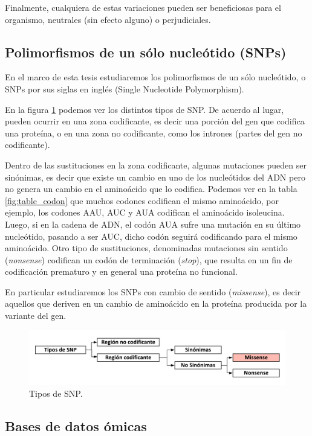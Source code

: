 Finalmente, cualquiera de estas variaciones pueden ser beneficiosas para el organismo, neutrales (sin efecto alguno) o perjudiciales. 

\subsection{Polimorfismos de un sólo nucleótido (SNPs)}

En el marco de esta tesis estudiaremos los polimorfismos de un sólo nucleótido, o SNPs por sus siglas en inglés (Single Nucleotide Polymorphism). 

En la figura \ref{fig:snp_types} podemos ver los distintos tipos de SNP. De acuerdo al lugar, pueden ocurrir en una zona codificante, es decir una porción del gen que codifica una proteína, o en una zona no codificante, como los intrones (partes del gen no codificante).

Dentro de las sustituciones en la zona codificante, algunas mutaciones pueden ser sinónimas, es decir que existe un cambio en uno de los nucleótidos del ADN pero no genera un cambio en el aminoácido que lo codifica. Podemos ver en la tabla \ref{fig:table_codon} que muchos codones codifican el mismo aminoácido, por ejemplo, los codones AAU, AUC y AUA codifican el aminoácido isoleucina. Luego, si en la cadena de ADN, el codón AUA sufre una mutación en su último nucleótido, pasando a ser AUC, dicho codón seguirá codificando para el mismo aminoácido. Otro tipo de sustituciones, denominadas mutaciones sin sentido (\textit{nonsense}) codifican un codón de terminación (\textit{stop}), que resulta en un fin de codificación prematuro y en general una proteína no funcional.

En particular estudiaremos los SNPs con cambio de sentido (\textit{missense}), es decir aquellos que deriven en un cambio de aminoácido en la proteína producida por la variante del gen. 

\begin{figure}[H]
\centering
    \includegraphics[scale=0.7]{documents/latex/figures/1/snp_types.pdf}
    \caption{Tipos de SNP.}
    \label{fig:snp_types}
\end{figure}


\subsection{Bases de datos ómicas}

